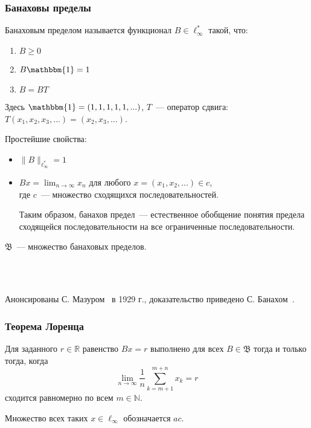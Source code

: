 \begin{frame}\frametitle{Банаховы пределы}
	Банаховым пределом называется функционал $B\in \ell_\infty^*$ такой, что:
	\begin{enumerate}
		\item
			$B \geqslant 0$
		\item
			$B\mathbbm{1} = 1$
		\item
			$B=BT$
	\end{enumerate}
	Здесь $\mathbbm{1}=(1,1,1,1,1,...)$,
	$T$~--- оператор сдвига: $T(x_1, x_2, x_3, ...) = (x_2, x_3, ...)$.

	Простейшие свойства:
	\begin{itemize}
		\item
			$\|B\|_{\ell_\infty^*} = 1$
		\item
			$Bx = \lim_{n\to\infty} x_n$ для любого $x=(x_1, x_2, ...) \in c$,
			\\
			где $c$~--- множество сходящихся последовательностей.

			Таким образом,
			банахов предел~--- естественное обобщение понятия предела сходящейся последовательности
			на все ограниченные последовательности.
	\end{itemize}

	$\mathfrak{B}$~--- множество банаховых пределов.

	~\\~

	Анонсированы С. Мазуром~\cite{Mazur} в 1929 г.,
	доказательство приведено С. Банахом~\cite{banach2001theory_rus}.

\end{frame}


\begin{frame}\frametitle{Теорема Лоренца~\cite{L}}
	Для заданного $r\in\mathbb{R}$ равенство $Bx=r$ выполнено для всех $B\in\mathfrak{B}$
	тогда и только тогда, когда
	\begin{equation*}
		\lim_{n\to\infty} \frac{1}{n} \sum_{k=m+1}^{m+n} x_k = r
	\end{equation*}
	сходится равномерно по всем $m\in\mathbb{N}$.

	Множество всех таких $x \in \ell_\infty$ обозначается $ac$.
\end{frame}

